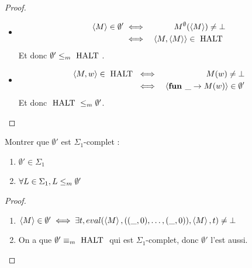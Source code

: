 \begin{proof}
	\begin{itemize}
		\item \begin{eqnarray*}
			      \left\langle M\right\rangle \in \emptyset' &\iff& M^{\emptyset} (\left\langle M\right\rangle) \neq \bot \\
			      &\iff& \left\langle M, \left\langle M\right\rangle\right\rangle \in \text{ HALT }
		      \end{eqnarray*}
		      Et donc $\emptyset' \leq_m \text{ HALT }$.

		\item
		      \begin{eqnarray*}
			      \left\langle M,w\right\rangle \in \text{ HALT } &\iff& M(w) \neq \bot \\
			      &\iff& \left\langle\textbf{fun } \_ \rightarrow M(w)\right\rangle \in \emptyset'
		      \end{eqnarray*}
		      Et donc $\text{ HALT } \leq_m \emptyset'$.
	\end{itemize}
\end{proof}


\begin{exercice}
	Montrer que $\emptyset '$ est $\Sigma_1$-complet :
	\begin{enumerate}
		\item $\emptyset' \in \Sigma_1$
		\item $\forall L \in \Sigma_1, L \leq_m \emptyset'$
	\end{enumerate}
\end{exercice}

\begin{proof}
	\begin{enumerate}
		\item $\left\langle M\right\rangle \in \emptyset' \iff \exists t, eval (\left\langle M\right\rangle, ((\_,0), \ldots, (\_,0)), \left\langle M\right\rangle, t) \neq \bot$
		\item On a que $\emptyset' \equiv_m \text{ HALT }$ qui est $\Sigma_1$-complet, donc $\emptyset'$ l'est aussi.
	\end{enumerate}
\end{proof}




